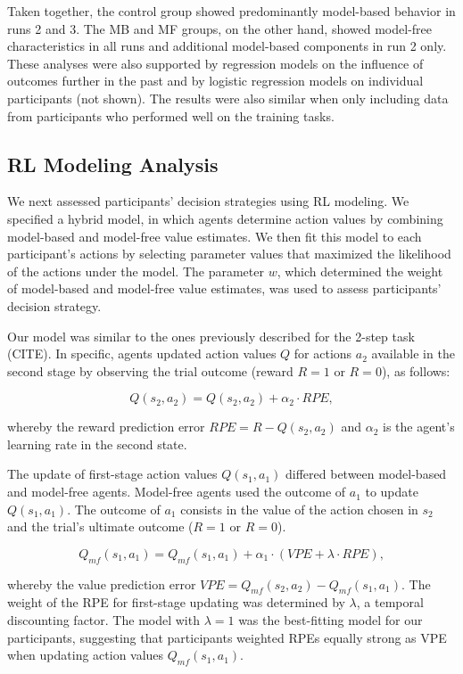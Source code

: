 \documentclass[11pt]{article} %
\begin{document}
Taken together, the control group showed predominantly model-based behavior in runs 2 and 3. The MB and MF groups, on the other hand, showed model-free characteristics in all runs and additional model-based components in run 2 only. These analyses were also supported by regression models on the influence of outcomes further in the past and by logistic regression models on individual participants (not shown). The results were also similar when only including data from participants who performed well on the training tasks.

\subsection{RL Modeling Analysis}
We next assessed participants' decision strategies using RL modeling. We specified a hybrid model, in which agents determine action values by combining model-based and model-free value estimates. We then fit this model to each participant's actions by selecting parameter values that maximized the likelihood of the actions under the model. The parameter $w$, which determined the weight of model-based and model-free value estimates, was used to assess participants' decision strategy.

Our model was similar to the ones previously described for the 2-step task (CITE). In specific, agents updated action values $Q$ for actions $a_{2}$ available in the second stage by observing the trial outcome (reward $R = 1$ or $R = 0$), as follows:

\begin{equation}
Q(s_{2}, a_{2}) = Q(s_{2}, a_{2}) + \alpha_{2} \cdot RPE,
\end{equation}

whereby the reward prediction error $RPE = R - Q(s_{2}, a_{2})$ and $\alpha_{2}$ is the agent's learning rate in the second state.

The update of first-stage action values $Q(s_{1}, a_{1})$ differed between model-based and model-free agents. Model-free agents used the outcome of $a_{1}$ to update $Q(s_{1}, a_{1})$. The outcome of $a_{1}$ consists in the value of the action chosen in $s_{2}$ and the trial's ultimate outcome ($R = 1$ or $R = 0$).

\begin{equation}
Q_{mf}(s_{1}, a_{1}) = Q_{mf}(s_{1}, a_{1}) + \alpha_{1} \cdot (VPE + \lambda \cdot RPE),
\end{equation}

whereby the value prediction error $VPE = Q_{mf}(s_{2}, a_{2}) - Q_{mf}(s_{1}, a_{1})$. The weight of the RPE for first-stage updating was determined by $ \lambda $, a temporal discounting factor. The model with $\lambda = 1$ was the best-fitting model for our participants, suggesting that participants weighted RPEs equally strong as VPE when updating action values $Q_{mf}(s_{1}, a_{1})$.
\end{document}
